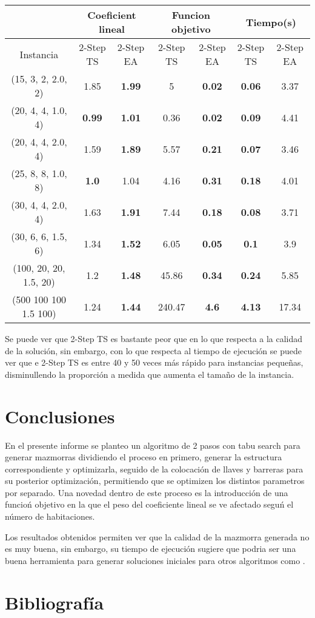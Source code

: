 \documentclass[letter, 10pt]{article}
\begin{document}
\begin{center}
\begin{tabular}{|c|c|c|c|c|c|c|}
\hline
 & \multicolumn{2}{|c|}{Coeficient lineal} & \multicolumn{2}{|c|}{Funcion objetivo} & \multicolumn{2}{|c|}{Tiempo(s)} \\
\hline
Instancia & 2-Step TS & 2-Step EA & 2-Step TS & 2-Step EA & 2-Step TS & 2-Step EA \\
\hline
(15, 3, 2, 2.0, 2) & 1.85 & \textbf{1.99} & 5 & \textbf{0.02} & \textbf{0.06} & 3.37 \\
(20, 4, 4, 1.0, 4) & \textbf{0.99} & \textbf{1.01} & 0.36 & \textbf{0.02} & \textbf{0.09} & 4.41\\
(20, 4, 4, 2.0, 4) & 1.59 & \textbf{1.89} & 5.57 & \textbf{0.21} & \textbf{0.07} & 3.46  \\
(25, 8, 8, 1.0, 8) & \textbf{1.0} & 1.04 & 4.16 & \textbf{0.31} & \textbf{0.18} & 4.01 \\
(30, 4, 4, 2.0, 4) & 1.63 & \textbf{1.91} & 7.44 & \textbf{0.18} & \textbf{0.08} & 3.71 \\
(30, 6, 6, 1.5, 6) & 1.34 & \textbf{1.52} & 6.05 & \textbf{0.05} & \textbf{0.1} & 3.9 \\
(100, 20, 20, 1.5, 20) & 1.2 & \textbf{1.48} & 45.86 & \textbf{0.34} & \textbf{0.24} & 5.85 \\
(500 100 100 1.5 100) & 1.24 & \textbf{1.44} & 240.47 & \textbf{4.6} & \textbf{4.13} & 17.34\\
\hline
\end{tabular}
\end{center}

Se puede ver que 2-Step TS es bastante peor que \cite{2stepEA} en lo que respecta a la calidad de la soluci\'on, sin embargo, con lo que respecta al tiempo de ejecuci\'on se puede ver que e 2-Step TS es entre 40 y 50 veces m\'as r\'apido para instancias peque\~nas, disminullendo la proporci\'on a medida que aumenta el tama\~no de la instancia.

\section{Conclusiones}
En el presente informe se planteo un algoritmo de 2 pasos con tabu search para generar mazmorras dividiendo el proceso en primero, generar la estructura correspondiente y optimizarla, seguido de la colocaci\'on de llaves y barreras para su posterior optimizaci\'on, permitiendo que se optimizen los distintos parametros por separado. Una novedad dentro de este proceso es la introducci\'on de una funcio\'n  objetivo en la que el peso del coeficiente lineal se ve afectado segu\'n el n\'umero de habitaciones. 

Los resultados obtenidos permiten ver que la calidad de la mazmorra generada no es muy buena, sin embargo, su tiempo de ejecuci\'on sugiere que podria ser una buena herramienta para generar soluciones iniciales para otros algoritmos como \cite{2stepEA}.



\section{Bibliograf\'ia}


\end{document}
